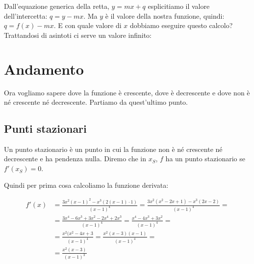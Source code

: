 Dall'equazione generica della retta, \(y=mx+q\) esplicitiamo il valore 
dell'intercetta: \(q=y-mx\). 
Ma \(y\) è il valore della nostra funzione, quindi: \(q=f(x)-mx\). 
E con quale valore di \(x\) dobbiamo eseguire questo calcolo? 
Trattandosi di asintoti ci serve un valore infinito:


\section{Andamento}
\label{sec:03_andamento}

Ora vogliamo sapere dove la funzione è crescente, dove è decrescente e dove 
non è né crescente né decrescente. Partiamo da quest'ultimo punto.

\subsection{Punti stazionari}

Un punto stazionario è un punto in cui la funzione non è né crescente né 
decrescente e ha pendenza nulla. 
Diremo che in \(x_S\), \(f\) ha un punto stazionario se \(f'(x_S) = 0\).

Quindi per prima cosa calcoliamo la funzione derivata:

\begin{align*}
f'(x) &= \frac{3x^2(x-1)^2-x^3(2(x-1)\cdot 1)}{(x-1)^4} =
       \frac{3x^2(x^2-2x+1)-x^3(2x-2)}{(x-1)^4} =\\
      &= \frac{3x^4-6x^3+3x^2-2x^4+2x^3}{(x-1)^4} =
       \frac{x^4-4x^3+3x^2}{(x-1)^4} =\\
      &= \frac{x^2(x^2-4x+3}{(x-1)^4} =
       \frac{x^2(x-3)(x-1)}{(x-1)^4} =\\
      &= \frac{x^2(x-3)}{(x-1)^3}
\end{align*}

